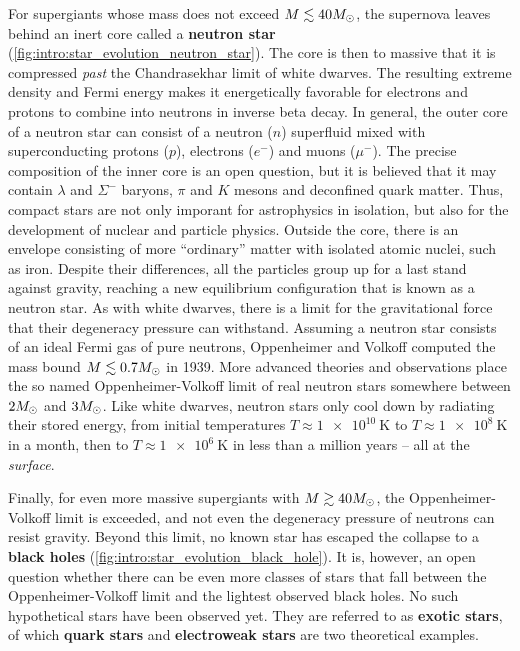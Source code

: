 For supergiants whose mass does not exceed $M \lesssim 40 M_\odot$, the supernova leaves behind an inert core called a \textbf{neutron star} (\cref{fig:intro:star_evolution_neutron_star}).
The core is then to massive that it is compressed \emph{past} the Chandrasekhar limit of white dwarves.
The resulting extreme density and Fermi energy makes it energetically favorable for electrons and protons to combine into neutrons in inverse beta decay.
In general, the outer core of a neutron star can consist of a neutron ($n$) superfluid mixed with superconducting protons ($p$), electrons ($e^-$) and muons ($\mu^-$). %
The precise composition of the inner core is an open question, but it is believed that it may contain $\lambda$ and $\Sigma^-$ baryons, $\pi$ and $K$ mesons and deconfined quark matter. %
Thus, compact stars are not only imporant for astrophysics in isolation, but also for the development of nuclear and particle physics.
Outside the core, there is an envelope consisting of more ``ordinary'' matter with isolated atomic nuclei, such as iron. %
Despite their differences, all the particles group up for a last stand against gravity, reaching a new equilibrium configuration that is known as a neutron star.
As with white dwarves, there is a limit for the gravitational force that their degeneracy pressure can withstand.
Assuming a neutron star consists of an ideal Fermi gas of pure neutrons, Oppenheimer and Volkoff computed the mass bound $M \lesssim 0.7 M_\odot$ in 1939. \cite{ref:tov}
More advanced theories and observations place the so named Oppenheimer-Volkoff limit of real neutron stars somewhere between $2 M_\odot$ and $3 M_\odot$. %
Like white dwarves, neutron stars only cool down by radiating their stored energy, from initial temperatures $T \approx \SI{1e10}{\kelvin}$ to $T \approx \SI{1e8}{\kelvin}$ in a month, then to $T \approx \SI{1e6}{\kelvin}$ in less than a million years -- all at the \emph{surface}. %

Finally, for even more massive supergiants with $M \gtrsim 40 M_\odot$, the Oppenheimer-Volkoff limit is exceeded, and not even the degeneracy pressure of neutrons can resist gravity.
Beyond this limit, no known star has escaped the collapse to a \textbf{black holes} (\cref{fig:intro:star_evolution_black_hole}).
It is, however, an open question whether there can be even more classes of stars that fall between the Oppenheimer-Volkoff limit and the lightest observed black holes.
No such hypothetical stars have been observed yet.
They are referred to as \textbf{exotic stars}, of which \textbf{quark stars} and \textbf{electroweak stars} are two theoretical examples.

